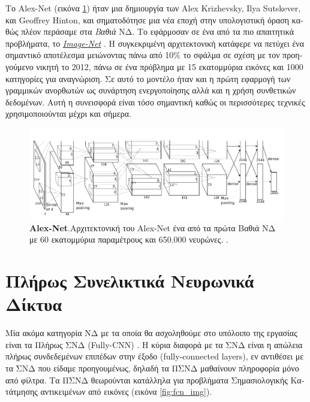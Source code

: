 \textgreek{Το } Alex-Net \textgreek{(εικόνα \ref{fig:alexnet_img}) ήταν μια δημιουργία των }Alex Krizhevsky, Ilya Sutskever, \textgreek{και} Geoffrey Hinton, \textgreek{και σηματοδότησε μια νέα εποχή στην υπολογιστική όραση καθώς πλέον περάσαμε στα \emph{Βαθιά} ΝΔ. Το εφάρμοσαν σε ένα από τα πιο απαιτητικά προβλήματα, το} \href{http://www.image-net.org/}{\emph{Image-Net}} \cite{imagenet_bib}. \textgreek{Η συγκεκριμένη αρχιτεκτονική κατάφερε να πετύχει ένα σημαντικό αποτέλεσμα μειώνοντας πάνω από 10\% το σφάλμα σε σχέση με τον προηγούμενο νικητή το 2012, πάνω σε ένα πρόβλημα με 15 εκατομμύρια εικόνες και 1000 κατηγορίες για αναγνώριση. Σε αυτό το μοντέλο ήταν και η πρώτη εφαρμογή των γραμμικών ανορθωτών ως συνάρτηση ενεργοποίησης αλλά και η χρήση συνθετικών δεδομένων. Αυτή η συνεισφορά είναι τόσο σημαντική καθώς οι περισσότερες τεχνικές χρησιμοποιούνται μέχρι και σήμερα.}

\begin{figure}[H]
 \centering
 \includegraphics[width=\textwidth, scale=0.5]{Images/alex_net}
\caption[\textgreek{ΣΝΔ }Alex-Net]{\textbf{Alex-Net}.\textgreek{Αρχιτεκτονική του }Alex-Net \textgreek{ένα από τα πρώτα Βαθιά ΝΔ με 60 εκατομμύρια παραμέτρους και 650.000 νευρώνες.} \cite{alex_net_bib}.}
 \label{fig:alexnet_img}
\end{figure}

\section{\textgreek{Πλήρως Συνελικτικά Νευρωνικά Δίκτυα}}
\textgreek{Μία ακόμα κατηγορία ΝΔ με τα οποία θα ασχοληθούμε στο υπόλοιπο της εργασίας είναι τα Πλήρως ΣΝΔ} (Fully-CNN) \cite{fcnn_1}. \textgreek{Η κύρια διαφορά με τα ΣΝΔ είναι η απώλεια πλήρως συνδεδεμένων επιπέδων στην έξοδο }(fully-connected layers), \textgreek{εν αντιθέσει με τα ΣΝΔ που είδαμε προηγουμένως, δηλαδή τα ΠΣΝΔ μαθαίνουν πληροφορία μόνο από φίλτρα. Τα ΠΣΝΔ θεωρούνται κατάλληλα για προβλήματα Σημασιολογικής Κατάτμησης αντικειμένων από εικόνες (εικόνα} \ref{fig:fcn_img}).

